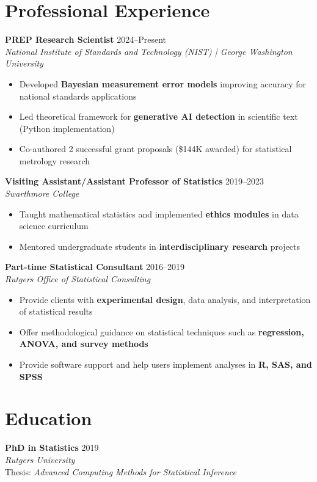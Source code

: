 \documentclass[10pt]{article}
\begin{document}
\section*{Professional Experience}
\textbf{PREP Research Scientist} \hfill 2024--Present \\ %
\textit{National Institute of Standards and Technology (NIST) | George Washington University}
\begin{itemize}[leftmargin=*,topsep=2pt,itemsep=1pt]
    \item Developed \textbf{Bayesian measurement error models} improving accuracy for national standards applications 
    \item Led theoretical framework for \textbf{generative AI detection} in scientific text (Python implementation) 
    \item Co-authored 2 successful grant proposals (\$144K awarded) for statistical metrology research
\end{itemize}

\noindent\textbf{Visiting Assistant/Assistant Professor of Statistics} \hfill 2019--2023 \\
\textit{Swarthmore College}
\begin{itemize}[leftmargin=*,topsep=2pt,itemsep=1pt]
    \item Taught mathematical statistics and implemented \textbf{ethics modules} in data science curriculum
    \item Mentored undergraduate students in \textbf{interdisciplinary research} projects %
\end{itemize}

\noindent\textbf{Part-time Statistical Consultant} \hfill 2016--2019 \\
\textit{Rutgers Office of Statistical Consulting}
\begin{itemize}[leftmargin=*,topsep=2pt,itemsep=1pt]
    \item Provide clients with \textbf{experimental design}, data analysis, and interpretation of statistical results
    \item Offer methodological guidance on statistical techniques such as \textbf{regression, ANOVA, and survey methods}
    \item Provide software support and help users implement analyses in \textbf{R, SAS, and SPSS}
\end{itemize}

\vspace{-1mm}
\section*{Education}
\textbf{PhD in Statistics} \hfill 2019 \\
\textit{Rutgers University} \\
Thesis: \textit{Advanced Computing Methods for Statistical Inference} \\
\end{document}
